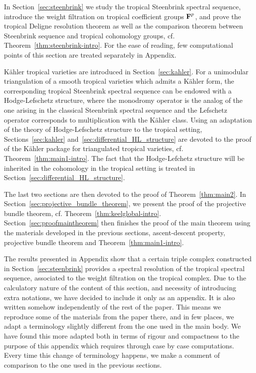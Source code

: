 \documentclass[11pt]{amsart}
\theoremstyle{definition}
\numberwithin{equation}{section}
\renewcommand{\~}{\widetilde}
\newcommand{\SF}{\textrm{\bf F}} %
\begin{document}
In Section~\ref{sec:steenbrink} we study the tropical Steenbrink spectral sequence, introduce the weight filtration on tropical coefficient groups $\SF^p$, and prove the tropical Deligne resolution theorem as well as the comparison theorem between Steenbrink sequence and tropical cohomology groups, cf. Theorem~\ref{thm:steenbrink-intro}. For the ease of reading, few computational points of this section are treated separately in Appendix.

K\"ahler tropical varieties are introduced in Section~\ref{sec:kahler}. For a unimodular triangulation of a smooth tropical varieties which admits a K\"ahler form, the corresponding tropical Steenbrink spectral sequence can be endowed with a Hodge-Lefschetz structure, where the monodromy operator is the analog of the one arising in the classical Steenbrink spectral sequence and the Lefschetz operator corresponds to multiplication with the K\"ahler class. Using an adaptation of the theory of Hodge-Lefschetz structure to the tropical setting, Sections~\ref{sec:kahler} and~\ref{sec:differential_HL_structure} are devoted to the proof of the K\"ahler package for triangulated tropical varieties, cf. Theorem~\ref{thm:main1-intro}. The fact that the Hodge-Lefchetz structure will be inherited in the cohomology in the tropical setting is treated in Section~\ref{sec:differential_HL_structure}.

The last two sections are then devoted to the proof of Theorem~\ref{thm:main2}. In Section~\ref{sec:projective_bundle_theorem}, we  present the proof of the projective bundle theorem, cf. Theorem~\ref{thm:keelglobal-intro}. Section~\ref{sec:proofmaintheorem} then finishes the proof of the main theorem using the materials developed in the previous sections, ascent-descent property, projective bundle theorem and Theorem~\ref{thm:main1-intro}.

\medskip

The results presented in Appendix show that a certain triple complex constructed in Section~\ref{sec:steenbrink} provides a spectral resolution of the tropical spectral sequence, associated to the weight filtration on the tropical complex. Due to the calculatory nature of the content of this section, and necessity of introducing extra notations, we have decided to include it only as an appendix. It is also written somehow independently of the rest of the paper. This means we reproduce some of the materials from the paper there, and in few places, we adapt a terminology slightly different from the one used in the main body. We have found this more adapted both in terms of rigour and compactness to the purpose of this appendix which requires through case by case computations. Every time this change of terminology happens, we make a comment of comparison to the one used in the previous sections.
\end{document}
